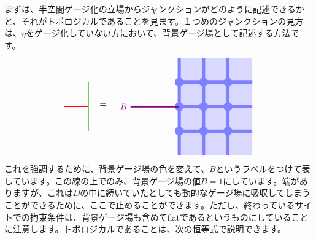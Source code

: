 \documentclass[report,paper=a4, fontsize=12pt, line_length=16cm, number_of_lines=33,dvipdfmx]{jlreq}
\numberwithin{equation}{chapter}
\begin{document}
まずは、半空間ゲージ化の立場からジャンクションがどのように記述できるかと、それがトポロジカルであることを見ます。１つめのジャンクションの見方は、$\eta$をゲージ化していない方において、背景ゲージ場として記述する方法です。
\begin{align}
  \begin{tikzpicture}[baseline=0]
      \draw[darkgreen,thick] (0,1)--(0,-1);
      \draw[red,thick] (-1,0)--(0,0);
  \end{tikzpicture}
  \quad
  =\quad
  \begin{tikzpicture}[baseline=0cm]
      \foreach \x in {0,1,2}{
          \foreach \y in {-2,-1,...,1}{
          \fill[plaqblue](\x,\y) rectangle (\x+1,\y+1);
          }
      }
      \foreach \x in {0,1,2}{
          \foreach \y in {-1,0,1}{
              \fill[linkblue] (\x,\y) circle (1.8mm);
          }
      }
      \foreach \x in {0,1,2}{
          \foreach \y in {-1,0,1}{
              \draw[linkblue, line width = 1.3mm](\x,\y)--(\x + 1,\y);
          }
      }
      \foreach \x in {0,1,2}{
          \foreach \y in {-2,-1,...,1}{
              \draw[linkblue, line width = 1.3mm](\x,\y)--(\x,\y + 1);
          }
      }
      \draw[red!50!blue, ultra thick](0,0)--(-2,0) node[left]{$B$};
  \end{tikzpicture}        
\end{align}
これを強調するために、背景ゲージ場の色を変えて、$B$というラベルをつけて表しています。この線の上でのみ、背景ゲージ場の値$B=1$にしています。端がありますが、これは$D$の中に続いていたとしても動的なゲージ場に吸収してしまうことができるために、ここで止めることができます。ただし、終わっているサイトでの拘束条件は、背景ゲージ場も含めてflatであるというものにしていることに注意します。トポロジカルであることは、次の恒等式で説明できます。
\end{document}
